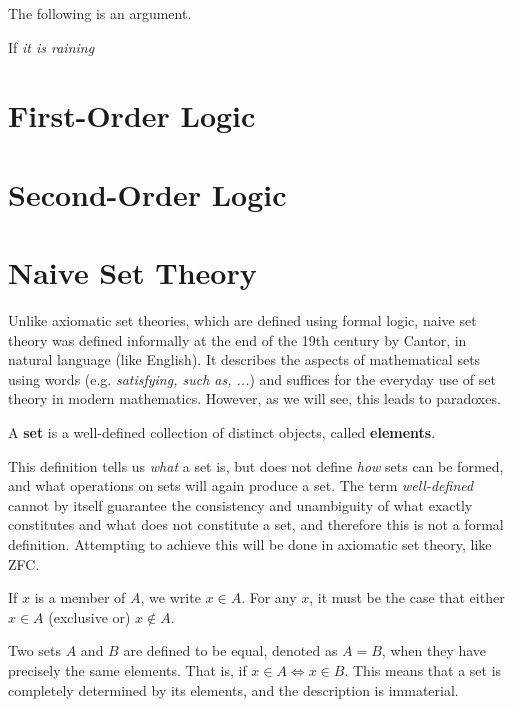 \documentclass{article}
\begin{document}
    \begin{example}
      The following is an argument. 
      \begin{center} 
        If \textit{it is raining} 
      \end{center} 
    \end{example}

\section{First-Order Logic}

\section{Second-Order Logic}

\section{Naive Set Theory}

    Unlike axiomatic set theories, which are defined using formal logic, naive set theory was defined informally at the end of the 19th century by Cantor, in natural language (like English). It describes the aspects of mathematical sets using words (e.g. \textit{satisfying, such as, ...}) and suffices for the everyday use of set theory in modern mathematics. However, as we will see, this leads to paradoxes. 

    \begin{definition}[Set]
      A \textbf{set} is a well-defined collection of distinct objects, called \textbf{elements}. 
    \end{definition}

    This definition tells us \textit{what} a set is, but does not define \textit{how} sets can be formed, and what operations on sets will again produce a set. The term \textit{well-defined} cannot by itself guarantee the consistency and unambiguity of what exactly constitutes and what does not constitute a set, and therefore this is not a formal definition. Attempting to achieve this will be done in axiomatic set theory, like ZFC. 

    \begin{definition}[Membership]
      If $x$ is a member of $A$, we write $x \in A$. For any $x$, it must be the case that either $x \in A$ (exclusive or) $x \not\in A$. 
    \end{definition}
    
    \begin{definition}[Equality]
      Two sets $A$ and $B$ are defined to be equal, denoted as $A = B$, when they have precisely the same elements. That is, if $x \in A \iff x \in B$. This means that a set is completely determined by its elements, and the description is immaterial. 
    \end{definition}
\end{document}
